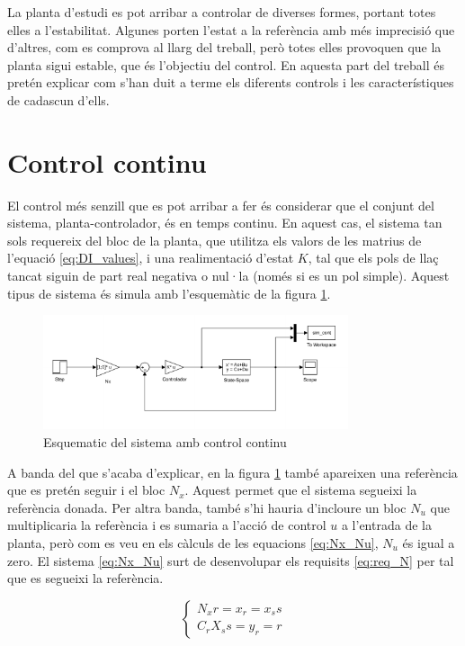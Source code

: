 \documentclass[12pt,a4paper,final,twoside,openright]{report}
\begin{document}
La planta d'estudi es pot arribar a controlar de diverses formes, portant totes elles a l'estabilitat. Algunes porten l'estat a la referència amb més imprecisió que d'altres, com es comprova al llarg del treball, però totes elles provoquen que la planta sigui estable, que és l'objectiu del control. En aquesta part del treball és pretén explicar com s'han duit a terme els diferents controls i les característiques de cadascun d'ells.

\section{Control continu}

El control més senzill que es pot arribar a fer és considerar que el conjunt del sistema, planta-controlador, és en temps continu. En aquest cas, el sistema tan sols requereix del bloc de la planta, que utilitza els valors de les matrius de l'equació \eqref{eq:DI_values}, i una realimentació d'estat $K$, tal que els pols de llaç tancat siguin de part real negativa o nul·la (només si es un pol simple). Aquest tipus de sistema és simula amb l'esquemàtic de la figura \ref{fig:cont_scheme}.

\begin{figure}
\centering
\includegraphics[width=0.8\textwidth]{Imatges/cont_sim_scheme.pdf}
\caption{Esquematic del sistema amb control continu\label{fig:cont_scheme}}
\end{figure}

A banda del que s'acaba d'explicar, en la figura \ref{fig:cont_scheme} també apareixen una referència que es pretén seguir i el bloc $N_x$. Aquest permet que el sistema segueixi la referència donada. Per altra banda, també s'hi hauria d'incloure un bloc $N_u$ que multiplicaria la referència i es sumaria a l'acció de control $u$ a l'entrada de la planta, però com es veu en els càlculs de les equacions \eqref{eq:Nx_Nu}, $N_u$ és igual a zero. El sistema \eqref{eq:Nx_Nu} surt de desenvolupar els requisits \eqref{eq:req_N} per tal que es segueixi la referència. 

\begin{equation}\label{eq:req_N}
\left\{
\begin{array}{lr}
N_x r = x_r = x_ss \\
C_r X_ss = y_r = r
\end{array}
\right.
\end{equation}
\end{document}
